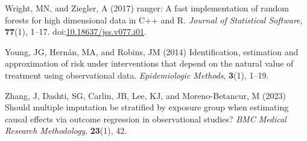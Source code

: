 \documentclass[
  single column]{article}
\newlength{\cslhangindent}
\newenvironment{CSLReferences}[2] %
 {\begin{list}{}{%
  \setlength{\itemindent}{0pt}
  \setlength{\leftmargin}{0pt}
  \setlength{\parsep}{0pt}
  \ifodd #1
   \setlength{\leftmargin}{\cslhangindent}
   \setlength{\itemindent}{-1\cslhangindent}
  \fi
  \setlength{\itemsep}{#2\baselineskip}}}
 {\end{list}}
\begin{document}
\begin{CSLReferences}{1}{0}
Wright, MN, and Ziegler, A (2017) {ranger}: A fast implementation of
random forests for high dimensional data in {C++} and {R}. \emph{Journal
of Statistical Software}, \textbf{77}(1), 1--17.
doi:\href{https://doi.org/10.18637/jss.v077.i01}{10.18637/jss.v077.i01}.

Young, JG, Hernán, MA, and Robins, JM (2014) Identification, estimation
and approximation of risk under interventions that depend on the natural
value of treatment using observational data. \emph{Epidemiologic
Methods}, \textbf{3}(1), 1--19.

Zhang, J, Dashti, SG, Carlin, JB, Lee, KJ, and Moreno-Betancur, M (2023)
Should multiple imputation be stratified by exposure group when
estimating causal effects via outcome regression in observational
studies? \emph{BMC Medical Research Methodology}, \textbf{23}(1), 42.

\end{CSLReferences}
\end{document}
